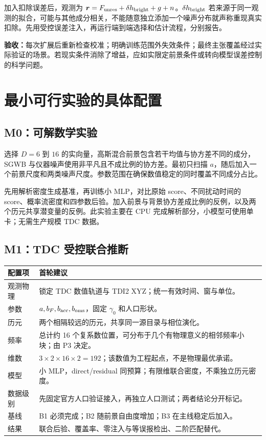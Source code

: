 \documentclass[UTF8,fontset=fandol,a4paper,11pt]{ctexart}
\numberwithin{equation}{section}
\newcommand{\br}{\boldsymbol r}
\begin{document}
加入扣除误差后，观测为 $\br=F_{\rm unres}+\delta h_{\rm bright}+g+n$。$\delta h_{\rm bright}$ 若来源于同一观测的拟合，可能与其他成分相关，不能随意独立添加一个噪声分布就声称重现真实扣除。先用受控误差注入，再运行端到端选择和估计流程，分别报告。

\textbf{验收：}每次扩展后重新检查校准；明确训练范围外失效条件；最终主张覆盖经过实际验证的场景。若现实条件消除了增益，应如实限定前景条件或转向模型误差控制的科学问题。

\section{最小可行实验的具体配置}
\subsection{M0：可解数学实验}
选择 $D=6$ 到 $16$ 的实向量，高斯混合前景包含若干均值与协方差不同的成分，SGWB 与仪器噪声使用非平凡且不成比例的协方差。最初只扫描 $a$，随后加入一个前景尺度和两类噪声尺度。参数范围在确保数值稳定的同时覆盖不同成分占比。

先用解析密度生成基准，再训练小 MLP，对比原始 score、不同扰动时间的 score、概率流密度和四参数后验。加入前景与背景协方差成比例的反例，以及两个历元共享潜变量的反例。此实验主要在 CPU 完成解析部分，小模型可使用单卡；无需生产规模 TDC 数据。

\subsection{M1：TDC 受控联合推断}
\noindent\begin{tabularx}{\linewidth}{P{3.1cm}Y}
\toprule 配置项 & 首轮建议\\\midrule
观测物理 & 锁定 TDC 数值轨道与 TDI2 XYZ；统一有效时间、窗与单位。\\
参数 & $a,b_F,b_{\rm acc},b_{\rm oms}$，固定 $\gamma_0$ 和人口形状。\\
历元 & 两个相隔较远的历元，共享同一源目录与相位演化。\\
频率 & 总计约 16 个复系数位置，可分布于几个有物理意义的相邻频率小块；由 P3 决定。\\
维数 & $3\times2\times16\times2=192$；该数值为工程起点，不是物理最优承诺。\\
模型 & 小 MLP，direct/residual 同预算；有限维联合密度，不乘独立历元密度。\\
数据级别 & 先固定官方人口验证接入，再独立人口测试；两者结论分开标记。\\
基线 & B1 必须完成；B2 随前景自由度增加；B3 在主线稳定后加入。\\
结果 & 联合后验、覆盖率、零注入与等误报检出、二阶匹配替代。\\\bottomrule
\end{tabularx}
\end{document}
